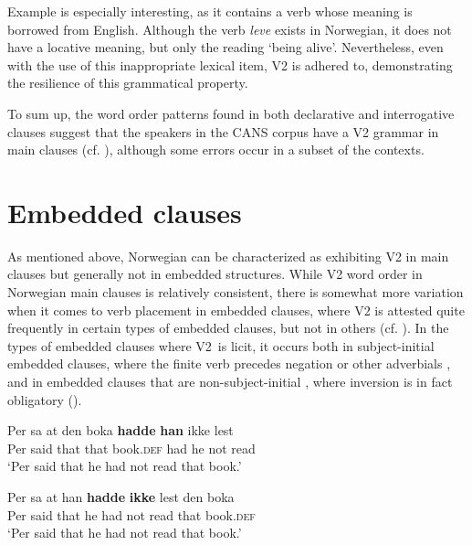 \documentclass[output=paper]{langscibook}
\begin{document}
Example  is especially interesting, as it contains a verb whose meaning is borrowed from English. Although the verb \textit{leve} exists in Norwegian, it does not have a locative meaning, but only the reading ‘being alive’. Nevertheless, even with the use of this inappropriate lexical item, V2 is adhered to, demonstrating the resilience of this grammatical property. 

To sum up, the word order patterns found in both declarative and interrogative clauses suggest that the speakers in the CANS corpus have a V2 grammar in main clauses (cf. \citealt{BousquetteEtAl2021, LarssonKinn2022}), although some errors occur in a subset of the contexts. 

\section{Embedded clauses}
\label{sec:anderssen:4}

As mentioned above, Norwegian can be characterized as exhibiting V2 in main clauses but generally not in embedded structures. While V2 word order in Norwegian main clauses is relatively consistent, there is somewhat more variation when it comes to verb placement in embedded clauses, where V2 is attested quite frequently in certain types of embedded clauses, but not in others (cf. ).  In the types of embedded clauses where V2~is licit, it occurs both in subject\hyp initial embedded clauses, where the finite verb precedes negation or other adverbials , and in embedded clauses that are non\hyp subject\hyp initial , where inversion is in fact obligatory (\citealt{HolmbergPlatzack1995, Vikner1995, Heycock2006, WiklundEtAl2009, Julien2007, Julien2015, Bentzen2014, Ringstad2019, Westendorp2021}). 

\ea%
    \label{ex:anderssen:15}
    \gll Per sa     at    den  boka       \textbf{hadde} \textbf{han} ikke lest\\
Per said that that book.\textsc{def} had      he   not read\\
\glt ‘Per said that he had not read that book.’

\ex%
    \label{ex:anderssen:16}
    \gll Per sa     at    han \textbf{hadde} \textbf{ikke} lest  den boka\\
Per said that he   had      not read that book.\textsc{def}\\
\glt ‘Per said that he had not read that book.’
\z
\end{document}
